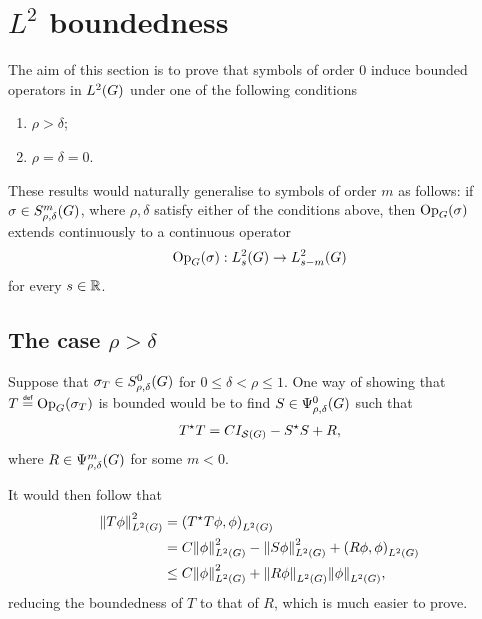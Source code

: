 \section{\texorpdfstring{$L^2$}{L2} boundedness}

The aim of this section is to prove
that symbols of order $0$ induce bounded operators in $\Lebesgue 2 \Group$
under one of the following conditions

\begin{enumerate}
    \item $\rho > \delta$;
    \item $\rho = \delta = 0$.
\end{enumerate}

These results would naturally generalise to symbols of order $m$ as follows:
if $\sigma \in \SymbolClass m {\rho, \delta}$,
where $\rho, \delta$ satisfy either of the conditions above,
then $\Op(\sigma)$ extends continuously to a continuous operator
\begin{align*}
    \Op(\sigma) : \Sobolev s \to \Sobolev {s - m}
\end{align*}
for every $s \in \R$.

\subsection{The case \texorpdfstring{$\rho > \delta$}{rho bigger than delta}}

Suppose that $\sigma_T \in \SymbolClass 0 {\rho, \delta}$ for $0 \leq \delta < \rho \leq 1$.
One way of showing that $T \defeq \Op(\sigma_T)$ is bounded would be to find $S \in \OperatorClass 0 {\rho, \delta}$ such that
\begin{align}
    \adj T T = C \Id {\Schwartz \Group} - \adj S S + R,
    \label{eq:L2_boundedness_decomposition}
\end{align}
where $R \in \OperatorClass m {\rho, \delta}$ for some $m < 0$.

It would then follow that
\begin{align*}
    \norm [\Lebesgue 2 \Group] {T \phi}^2
    &= \ip [\Lebesgue 2 \Group] {\adj T T \phi} \phi\\
    &= C \norm [\Lebesgue 2 \Group] {\phi}^2 - \norm [\Lebesgue 2 \Group] {S \phi}^2 + \ip [\Lebesgue 2 \Group] {R \phi} \phi\\
    &\leq C \norm [\Lebesgue 2 \Group] {\phi}^2 + \norm [\Lebesgue 2 \Group] {R \phi} \norm [\Lebesgue 2 \Group] \phi,
\end{align*}
reducing the boundedness of $T$ to that of $R$,
which is much easier to prove.

